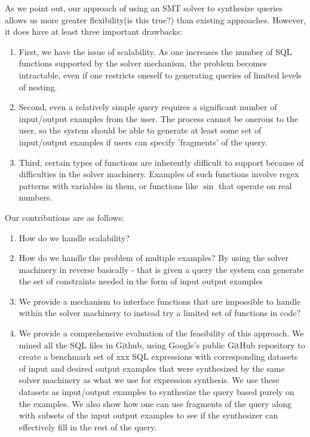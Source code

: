 As we point out, our approach of using an SMT solver to synthesize queries allows us more greater flexibility(is this true?) than existing approaches.  However, it does have at least three important drawbacks:
\begin{enumerate}
\item First, we have the issue of scalability.  As one increases the number of SQL functions supported by the solver mechanism, the problem becomes intractable, even if one restricts oneself to generating queries of limited levels of nesting.
\item Second, even a relatively simple query requires a significant number of input/output examples from the user.  The process cannot be onerous to the user, so the system should be able to generate at least some set of input/output examples if users can specify 'fragments' of the query.
\item Third, certain types of functions are inherently difficult to support because of difficulties in the solver machinery.  Examples of such functions involve regex patterns with variables in them, or functions like $\sin$ that operate on real numbers.
\end{enumerate} 
  
Our contributions are as follows:
\begin{enumerate}
\item How do we handle scalability?
\item How do we handle the problem of multiple examples?  By using the solver machinery in reverse basically - that is given a query the system can generate the set of constraints needed in the form of input output examples
\item We provide a mechanism to interface functions that are impossible to handle within the solver machinery to instead try a limited set of functions in code?
\item We provide a comprehensive evaluation of the feasibility of this approach.  We mined all the SQL files in Github, using Google's public GitHub repository \cite{GitHub_repo} to create a benchmark set of xxx SQL expressions with corresponding datasets of input and desired output examples that were synthesized by the same solver machinery as what we use for expression synthesis. We use these datasets as input/output examples to synthesize the query based purely on the examples.  We also show how one can use fragments of the query along with subsets of the input output examples to see if the synthesizer can effectively fill in the rest of the query.  
\end{enumerate}
